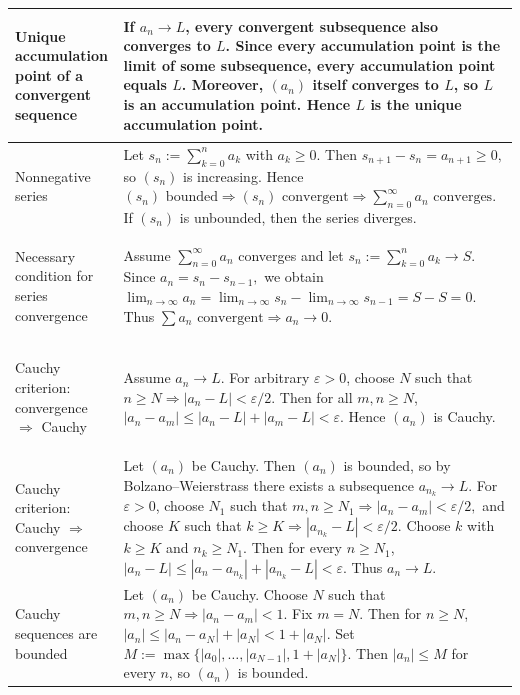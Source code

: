 {\begin{minipage}[t]{0.495\textwidth}
\begin{tabular}{
    @{}
    >{\bfseries\raggedright\arraybackslash}p{3.0cm}
    >{\raggedright\arraybackslash}p{10.4cm}
    @{}
}
\midrule

Unique accumulation point of a convergent sequence &
If $a_n\to L$, every convergent subsequence also converges to $L$.
Since every accumulation point is the limit of some subsequence, every
accumulation point equals $L$. Moreover, $(a_n)$ itself converges to $L$,
so $L$ is an accumulation point. Hence $L$ is the unique accumulation
point.
\\

\midrule

Nonnegative series &
Let
$
s_n:=\sum_{k=0}^{n}a_k
$
with $a_k\ge0$. Then
$
s_{n+1}-s_n=a_{n+1}\ge0,
$
so $(s_n)$ is increasing. Hence
$
(s_n)\text{ bounded}
\Rightarrow
(s_n)\text{ convergent}
\Rightarrow
\sum_{n=0}^{\infty}a_n\text{ converges}.
$
If $(s_n)$ is unbounded, then the series diverges.
\\

\midrule

Necessary condition for series convergence &
Assume
$
\sum_{n=0}^{\infty}a_n
$
converges and let
$
s_n:=\sum_{k=0}^{n}a_k\to S.
$
Since
$
a_n=s_n-s_{n-1},
$
we obtain
$
\lim_{n\to\infty}a_n
=
\lim_{n\to\infty}s_n
-
\lim_{n\to\infty}s_{n-1}
=
S-S=0.
$
Thus
$
\sum a_n\text{ convergent}
\Rightarrow
a_n\to0.
$
\\

\midrule

Cauchy criterion: convergence $\Rightarrow$ Cauchy &
Assume $a_n\to L$. For arbitrary $\varepsilon>0$, choose $N$ such that
$
n\ge N\Rightarrow |a_n-L|<\varepsilon/2.
$
Then for all $m,n\ge N$,
$
|a_n-a_m|
\le
|a_n-L|+|a_m-L|
<
\varepsilon.
$
Hence $(a_n)$ is Cauchy.
\\

\midrule

Cauchy criterion: Cauchy $\Rightarrow$ convergence &
Let $(a_n)$ be Cauchy. Then $(a_n)$ is bounded, so by
Bolzano--Weierstrass there exists a subsequence
$
a_{n_k}\to L.
$
For $\varepsilon>0$, choose $N_1$ such that
$
m,n\ge N_1\Rightarrow |a_n-a_m|<\varepsilon/2,
$
and choose $K$ such that
$
k\ge K\Rightarrow |a_{n_k}-L|<\varepsilon/2.
$
Choose $k$ with
$
k\ge K
$
and
$
n_k\ge N_1.
$
Then for every $n\ge N_1$,
$
|a_n-L|
\le
|a_n-a_{n_k}|+|a_{n_k}-L|
<
\varepsilon.
$
Thus $a_n\to L$.
\\

\midrule

Cauchy sequences are bounded &
Let $(a_n)$ be Cauchy. Choose $N$ such that
$
m,n\ge N\Rightarrow |a_n-a_m|<1.
$
Fix $m=N$. Then for $n\ge N$,
$
|a_n|
\le
|a_n-a_N|+|a_N|
<
1+|a_N|.
$
Set
$
M:=\max\{|a_0|,\ldots,|a_{N-1}|,1+|a_N|\}.
$
Then
$
|a_n|\le M
$
for every $n$, so $(a_n)$ is bounded.
\\


\end{tabular}
\end{minipage}}
